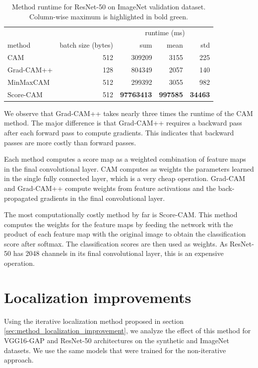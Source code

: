 \begin{table}[ht]
\centering
\begin{tabular}{lrrrr}
\toprule
\multicolumn{2}{c}{} & \multicolumn{3}{c}{runtime (ms)} \\
method & batch size (bytes) & sum & mean & std \\
\cmidrule(lr){1-2} \cmidrule(lr){3-5}
CAM & 512 & 309209 & 3155 & 225 \\
Grad-CAM++ & 128 & 804349 & 2057 & 140 \\
MinMaxCAM & 512 & 299392 & 3055 & 982 \\
Score-CAM & 512 & \color{teal} \bfseries 97763413 & \color{teal} \bfseries 997585 & \color{teal} \bfseries 34463\\
\bottomrule
\end{tabular}
\caption[Method runtime for ResNet-50 on ImageNet validation dataset]{Method runtime for ResNet-50 on ImageNet validation dataset.  Column-wise maximum is highlighted in bold green.}
\label{tab:runtime_resnet50_imagenet}
\end{table}

We observe that Grad-CAM++ takes nearly three times the runtime of the CAM method. The major difference is that Grad-CAM++ requires a backward pass after each forward pass to compute gradients. This indicates that backward passes are more costly than forward passes.

Each method computes a score map as a weighted combination of feature maps in the final convolutional layer. CAM computes as weights the parameters learned in the single fully connected layer, which is a very cheap operation. Grad-CAM and Grad-CAM++ compute weights from feature activations and the back-propagated gradients in the final convolutional layer.

The most computationally costly method by far is Score-CAM. This method computes the weights for the feature maps by feeding the network with the product of each feature map with the original image to obtain the classification score after softmax. The classification scores are then used as weights. As ResNet-50 has 2048 channels in its final convolutional layer, this is an expensive operation.

\section{Localization improvements} \label{sec:exp_loc_improvements}

Using the iterative localization method proposed in section \ref{sec:method_localization_improvement}, we analyze the effect of this method for VGG16-GAP and ResNet-50 architectures on the synthetic and ImageNet datasets. We use the same models that were trained for the non-iterative approach.

